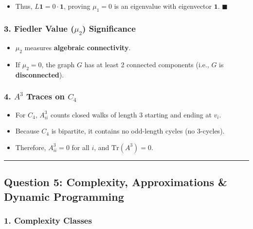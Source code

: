 \documentclass[
]{book}
\providecommand{\tightlist}{%
  \setlength{\itemsep}{0pt}\setlength{\parskip}{0pt}}
\theoremstyle{definition}
\theoremstyle{definition}
\theoremstyle{definition}
\theoremstyle{definition}
\theoremstyle{remark}
\begin{document}
\begin{itemize}
\tightlist
\item
  Thus, \(L \mathbf{1} = 0 \cdot \mathbf{1}\), proving \(\mu_1 = 0\) is an eigenvalue with eigenvector \(\mathbf{1}\). \(\blacksquare\)
\end{itemize}

\subsubsection{\texorpdfstring{3. Fiedler Value (\(\mu_2\)) Significance}{3. Fiedler Value (\textbackslash mu\_2) Significance}}\label{fiedler-value-mu_2-significance}

\begin{itemize}
\tightlist
\item
  \(\mu_2\) measures \textbf{algebraic connectivity}.
\item
  If \(\mu_2 = 0\), the graph \(G\) has at least 2 connected components (i.e., \(G\) is \textbf{disconnected}).
\end{itemize}

\subsubsection{\texorpdfstring{4. \(A^3\) Traces on \(C_4\)}{4. A\^{}3 Traces on C\_4}}\label{a3-traces-on-c_4}

\begin{itemize}
\tightlist
\item
  For \(C_4\), \(A^3_{ii}\) counts closed walks of length 3 starting and ending at \(v_i\).
\item
  Because \(C_4\) is bipartite, it contains no odd-length cycles (no 3-cycles).
\item
  Therefore, \(A^3_{ii} = 0\) for all \(i\), and \(\text{Tr}(A^3) = 0\).
\end{itemize}

\begin{center}\rule{0.5\linewidth}{0.5pt}\end{center}

\subsection{Question 5: Complexity, Approximations \& Dynamic Programming}\label{question-5-complexity-approximations-dynamic-programming}

\subsubsection{1. Complexity Classes}\label{complexity-classes-1}
\end{document}
